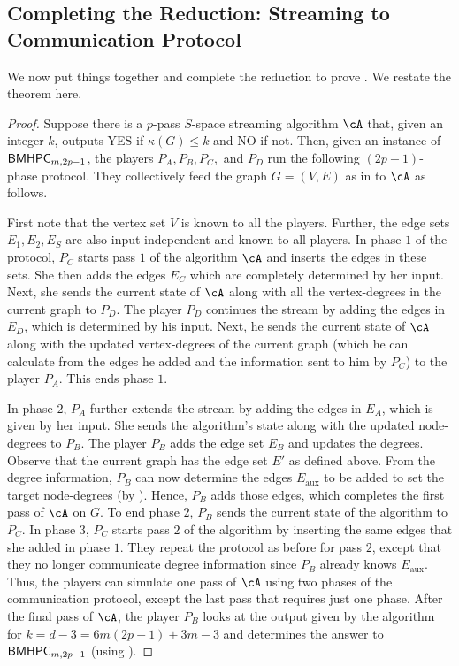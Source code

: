 \documentclass[11pt,letterpaper]{article}
\renewcommand{\leq}{\leqslant}
\theoremstyle{definition}
\newcommand{\bmhpc}{\ensuremath{\textnormal{\textsf{BMHPC}}}\xspace}
\newcommand{\Eaux}{E_{\text{aux}}}
\begin{document}
\subsection{Completing the Reduction: Streaming to Communication Protocol}
We now put things together and complete the reduction to prove . We restate the theorem here. 

\mainthmdegen*


\begin{proof}
Suppose there is a $p$-pass $S$-space streaming algorithm $\cA$ that, given an integer $k$, outputs YES if $\kappa(G)\leq k$ and NO if not. Then, given an instance of $\bmhpc_{m,2p-1}$, the players $P_A, P_B, P_C,$ and $P_D$ run the following $(2p-1)$-phase protocol. They collectively feed the graph $G=(V,E)$ as in  to $\cA$ as follows. 

First note that the vertex set $V$ is known to all the players. Further, the edge sets $E_1,E_2,E_S$ are also input-independent and known to all players. In phase $1$ of the protocol, $P_C$ starts pass $1$ of the algorithm $\cA$ and inserts the edges in these sets. She then adds the edges $E_C$ which are completely determined by her input. Next, she sends the current state of $\cA$ along with all the vertex-degrees in the current graph to $P_D$. The player $P_D$ continues the stream by adding the edges in $E_D$, which is determined by his input. Next, he sends the current state of $\cA$ along with the updated vertex-degrees of the current graph (which he can calculate from the edges he added and the information sent to him by $P_C$) to the player $P_A$. This ends phase $1$.

In phase $2$, $P_A$ further extends the stream by adding the edges in $E_A$, which is given by her input. She sends the algorithm's state along with the updated node-degrees to $P_B$. The player $P_B$ adds the edge set $E_B$ and updates the degrees. Observe that the current graph has the edge set $E'$ as defined above. From the degree information, $P_B$ can now determine the edges $\Eaux$ to be added to set the target node-degrees (by ). Hence, $P_B$ adds those edges, which completes the first pass of $\cA$ on $G$. To end phase $2$, $P_B$ sends the current state of the algorithm to $P_C$. In phase $3$, $P_C$ starts pass $2$ of the algorithm by inserting the same edges that she added in phase $1$. They repeat the protocol as before for pass $2$, except that they no longer communicate degree information since $P_B$ already knows $\Eaux$. Thus, the players can simulate one pass of $\cA$ using two phases of the communication protocol, except the last pass that requires just one phase. After the final pass of $\cA$, the player $P_B$ looks at the output given by the algorithm for $k = d-3 = 6m(2p-1)+3m-3$ and determines the answer to $\bmhpc_{m,2p-1}$ (using ). 


\end{proof}
\end{document}
